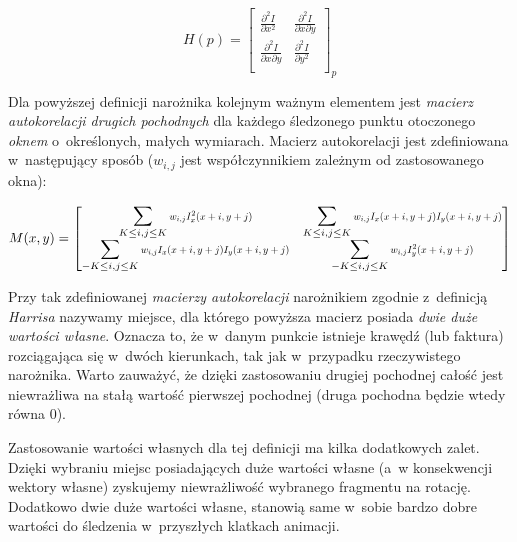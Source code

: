     \[
      H(p) =
        \begin{bmatrix}
          \frac{\partial^2 I}{\partial x^2} & \frac{\partial^2 I}{\partial x\partial y} \\
          \frac{\partial^2 I}{\partial x\partial y} & \frac{\partial^2 I}{\partial y^2} \\
        \end{bmatrix}_{p}
    \]

    Dla powyższej definicji narożnika kolejnym ważnym elementem jest \textit{macierz autokorelacji drugich pochodnych} dla każdego śledzonego punktu otoczonego \textit{oknem} o~określonych, małych wymiarach. Macierz autokorelacji jest zdefiniowana w~następujący sposób ($w_{i,j}$ jest współczynnikiem zależnym od zastosowanego okna):

    \[
      M(x, y) =
        \begin{bmatrix}
            \displaystyle\sum\limits_{K \le i, j \le K}
              \scalemath{0.75}{w_{i,j} I_{x}^{2} (x + i, y + j)} &
            \displaystyle\sum\limits_{K \le i, j \le K}
              \scalemath{0.75}{w_{i,j} I_{x} (x + i, y + j) I_{y} (x + i, y + j)} \\

            \displaystyle\sum\limits_{-K \le i, j \le K}
              \scalemath{0.75}{w_{i,j} I_{x} (x + i, y + j) I_{y} (x + i, y + j)} &
            \displaystyle\sum\limits_{-K \le i, j \le K}
              \scalemath{0.75}{w_{i,j} I_{y}^{2} (x + i, y + j)} \\
        \end{bmatrix}
    \]

    Przy tak zdefiniowanej \textit{macierzy autokorelacji} narożnikiem zgodnie z~definicją \textit{Harrisa} nazywamy miejsce, dla którego powyższa macierz posiada \textit{dwie duże wartości własne}. Oznacza to, że w~danym punkcie istnieje krawędź (lub faktura) rozciągająca się w~dwóch kierunkach, tak jak w~przypadku rzeczywistego narożnika. Warto zauważyć, że dzięki zastosowaniu drugiej pochodnej całość jest niewrażliwa na stałą wartość pierwszej pochodnej (druga pochodna będzie wtedy równa $0$).

    Zastosowanie wartości własnych dla tej definicji ma kilka dodatkowych zalet. Dzięki wybraniu miejsc posiadających duże wartości własne (a~w konsekwencji wektory własne) zyskujemy niewrażliwość wybranego fragmentu na rotację. Dodatkowo dwie duże wartości własne, stanowią same w~sobie bardzo dobre wartości do śledzenia w~przyszłych klatkach animacji.

